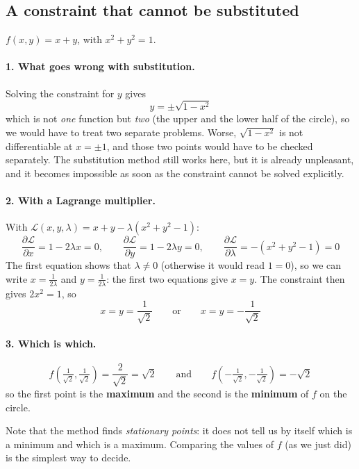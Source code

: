 \documentclass[]{article}
\begin{document}
	\subsection{A constraint that cannot be substituted}

	$f(x,y) = x + y$, with $x^2 + y^2 = 1$.

	\paragraph{1. What goes wrong with substitution.}
	Solving the constraint for $y$ gives
	$$
	y = \pm\sqrt{1 - x^2}
	$$
	which is not \textit{one} function but \textit{two} (the upper and the lower half of the circle), so we would have to treat two separate problems.
	Worse, $\sqrt{1-x^2}$ is not differentiable at $x = \pm 1$, and those two points would have to be checked separately.
	The substitution method still works here, but it is already unpleasant, and it becomes impossible as soon as the constraint cannot be solved explicitly.

	\paragraph{2. With a Lagrange multiplier.}
	With $\mathcal{L}(x,y,\lambda) = x + y - \lambda(x^2 + y^2 - 1)$:
	$$
	\frac{\partial \mathcal{L}}{\partial x} = 1 - 2\lambda x = 0,
	\qquad
	\frac{\partial \mathcal{L}}{\partial y} = 1 - 2\lambda y = 0,
	\qquad
	\frac{\partial \mathcal{L}}{\partial \lambda} = -(x^2 + y^2 - 1) = 0
	$$
	The first equation shows that $\lambda \neq 0$ (otherwise it would read $1 = 0$), so we can write $x = \frac{1}{2\lambda}$ and $y = \frac{1}{2\lambda}$: the first two equations give $x = y$.
	The constraint then gives $2x^2 = 1$, so
	$$
	x = y = \frac{1}{\sqrt{2}}
	\qquad \text{or} \qquad
	x = y = -\frac{1}{\sqrt{2}}
	$$

	\paragraph{3. Which is which.}
	$$
	f\left(\tfrac{1}{\sqrt{2}}, \tfrac{1}{\sqrt{2}}\right) = \frac{2}{\sqrt{2}} = \sqrt{2}
	\qquad \text{and} \qquad
	f\left(-\tfrac{1}{\sqrt{2}}, -\tfrac{1}{\sqrt{2}}\right) = -\sqrt{2}
	$$
	so the first point is the \textbf{maximum} and the second is the \textbf{minimum} of $f$ on the circle.

	Note that the method finds \textit{stationary points}: it does not tell us by itself which is a minimum and which is a maximum.
	Comparing the values of $f$ (as we just did) is the simplest way to decide.
\end{document}
